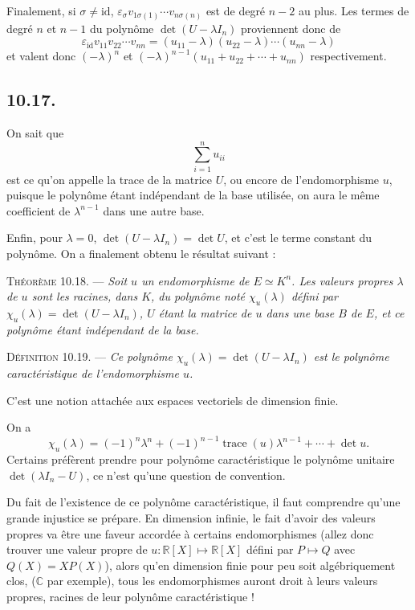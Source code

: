 Finalement, si $\sigma\ne\mathrm{id}$, $\varepsilon_\sigma v_{1\sigma(1)}\cdots v_{n\sigma(n)}$ est de degré $n-2$ au plus. Les termes de degré $n$ et $n-1$ du polynôme $\det(U-\lambda I_n)$ proviennent donc de
\[
\varepsilon_{\mathrm{id}}v_{11}v_{22}\cdots v_{nn}=(u_{11}-\lambda)(u_{22}-\lambda)\cdots(u_{nn}-\lambda)
\]
et valent donc $(-\lambda)^n$ et $(-\lambda)^{n-1}(u_{11}+u_{22}+\cdots+u_{nn})$ respectivement.

\subsection*{10.17.}
On sait que
\[
\sum_{i=1}^nu_{ii}
\]
est ce qu'on appelle la trace de la matrice $U$, ou encore de l'endomorphisme $u$, puisque le polynôme étant indépendant de la base utilisée, on aura le même coefficient de $\lambda^{n-1}$ dans une autre base.

Enfin, pour $\lambda=0$, $\det(U-\lambda I_n)=\det U$, et c'est le terme constant du polynôme. On a finalement obtenu le résultat suivant :

\medskip\noindent\textsc{Théorème 10.18.} --- \emph{Soit $u$ un endomorphisme de $E\simeq K^n$. Les valeurs propres $\lambda$ de $u$ sont les racines, dans $K$, du polynôme noté $\chi_u(\lambda)$ défini par $\chi_u(\lambda)=\det(U-\lambda I_n)$, $U$ étant la matrice de $u$ dans une base $B$ de $E$, et ce polynôme étant indépendant de la base.}

\medskip\noindent\textsc{Définition 10.19.} --- \emph{Ce polynôme $\chi_u(\lambda)=\det(U-\lambda I_n)$ est le polynôme caractéristique de l'endomorphisme $u$.}

C'est une notion attachée aux espaces vectoriels de dimension finie.

On a
\[
\chi_u(\lambda)=(-1)^n\lambda^n+(-1)^{n-1}\operatorname{trace}(u)\lambda^{n-1}+\cdots+\det u.
\]
Certains préfèrent prendre pour polynôme caractéristique le polynôme unitaire $\det(\lambda I_n-U)$, ce n'est qu'une question de convention.

Du fait de l'existence de ce polynôme caractéristique, il faut comprendre qu'une grande injustice se prépare. En dimension infinie, le fait d'avoir des valeurs propres va être une faveur accordée à certains endomorphismes (allez donc trouver une valeur propre de $u:\mathbb R[X]\longmapsto\mathbb R[X]$ défini par $P\longmapsto Q$ avec $Q(X)=XP(X)$), alors qu'en dimension finie pour peu  soit algébriquement clos, ($\mathbb C$ par exemple), tous les endomorphismes auront droit à leurs valeurs propres, racines de leur polynôme caractéristique !

